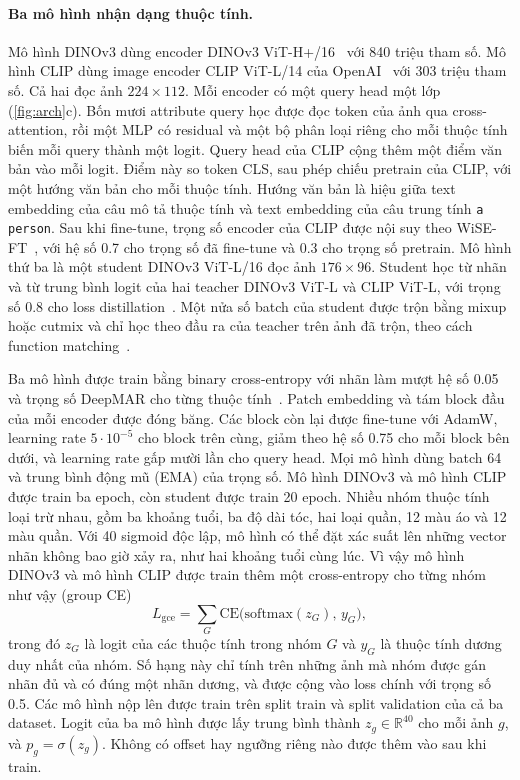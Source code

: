 \documentclass[10pt,twocolumn,letterpaper]{article}
\begin{document}
\paragraph{Ba mô hình nhận dạng thuộc tính.} Mô hình DINOv3 dùng encoder DINOv3 ViT-H+/16~\cite{dinov3} với 840 triệu tham số. Mô hình CLIP dùng image encoder CLIP ViT-L/14 của OpenAI~\cite{clip} với 303 triệu tham số. Cả hai đọc ảnh $224\times112$. Mỗi encoder có một query head một lớp~\cite{q2l,mldecoder} (\cref{fig:arch}c). Bốn mươi attribute query học được đọc token của ảnh qua cross-attention, rồi một MLP có residual và một bộ phân loại riêng cho mỗi thuộc tính biến mỗi query thành một logit. Query head của CLIP cộng thêm một điểm văn bản vào mỗi logit. Điểm này so token CLS, sau phép chiếu pretrain của CLIP, với một hướng văn bản cho mỗi thuộc tính. Hướng văn bản là hiệu giữa text embedding của câu mô tả thuộc tính và text embedding của câu trung tính \texttt{a person}. Sau khi fine-tune, trọng số encoder của CLIP được nội suy theo WiSE-FT~\cite{wiseft}, với hệ số 0.7 cho trọng số đã fine-tune và 0.3 cho trọng số pretrain. Mô hình thứ ba là một student DINOv3 ViT-L/16 đọc ảnh $176\times96$. Student học từ nhãn và từ trung bình logit của hai teacher DINOv3 ViT-L và CLIP ViT-L, với trọng số 0.8 cho loss distillation~\cite{hinton}. Một nửa số batch của student được trộn bằng mixup hoặc cutmix và chỉ học theo đầu ra của teacher trên ảnh đã trộn, theo cách function matching~\cite{patient}.

Ba mô hình được train bằng binary cross-entropy với nhãn làm mượt hệ số 0.05~\cite{szegedy} và trọng số DeepMAR cho từng thuộc tính~\cite{deepmar}. Patch embedding và tám block đầu của mỗi encoder được đóng băng. Các block còn lại được fine-tune với AdamW, learning rate $5\cdot10^{-5}$ cho block trên cùng, giảm theo hệ số 0.75 cho mỗi block bên dưới, và learning rate gấp mười lần cho query head. Mọi mô hình dùng batch 64 và trung bình động mũ (EMA) của trọng số. Mô hình DINOv3 và mô hình CLIP được train ba epoch, còn student được train 20 epoch. Nhiều nhóm thuộc tính loại trừ nhau, gồm ba khoảng tuổi, ba độ dài tóc, hai loại quần, 12 màu áo và 12 màu quần. Với 40 sigmoid độc lập, mô hình có thể đặt xác suất lên những vector nhãn không bao giờ xảy ra, như hai khoảng tuổi cùng lúc. Vì vậy mô hình DINOv3 và mô hình CLIP được train thêm một cross-entropy cho từng nhóm như vậy (group CE)
\begin{equation}
L_{\mathrm{gce}}=\sum_{G}\mathrm{CE}\big(\mathrm{softmax}(z_G),\,y_G\big),
\label{eq:gce}
\end{equation}
trong đó $z_G$ là logit của các thuộc tính trong nhóm $G$ và $y_G$ là thuộc tính dương duy nhất của nhóm. Số hạng này chỉ tính trên những ảnh mà nhóm được gán nhãn đủ và có đúng một nhãn dương, và được cộng vào loss chính với trọng số 0.5. Các mô hình nộp lên được train trên split train và split validation của cả ba dataset. Logit của ba mô hình được lấy trung bình thành $z_g\in\mathbb{R}^{40}$ cho mỗi ảnh $g$, và $p_g=\sigma(z_g)$. Không có offset hay ngưỡng riêng nào được thêm vào sau khi train.
\end{document}
